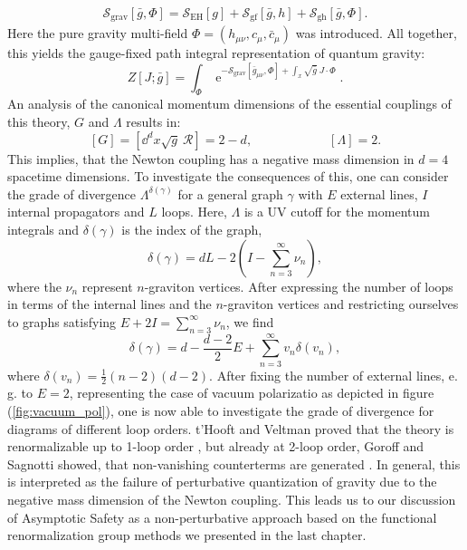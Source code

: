 \begin{align}
	\mathcal{S}_{\text{grav}}[\bar{g},\Phi] = \mathcal{S}_{\text{EH}}[g] + \mathcal{S}_{\text{gf}}[\bar{g}, h] + \mathcal{S}_{\text{gh}}[\bar{g},\Phi] .
\end{align}
 Here the pure gravity multi-field $\Phi=(h_{\mu\nu}, c_{\mu}, \bar{c}_{\mu})$ was introduced. All together, this yields the gauge-fixed path integral representation of quantum gravity:
 \begin{equation}
Z[J ; \bar{g}]=\int_{\Phi} \operatorname{e}^{-\mathcal{S}_{\text{grav}}\left[\bar{g}_{\mu\nu}, \Phi\right]+\int_x \sqrt{\bar{g}} \ J \cdot \Phi}.
\end{equation}
An analysis of the canonical momentum dimensions of the essential couplings of this theory, $G$ and $\Lambda$ results in:
\begin{equation}
\left[G\right] = \left[\dd^dx \sqrt{g}\ \mathcal{R}\right] = 2-d,  \qquad\qquad\qquad \left[\Lambda\right] = 2.
\end{equation}
This implies, that the Newton coupling has a negative mass dimension in $d=4$ spacetime dimensions. To investigate the consequences of this, one can consider the grade of divergence $\Lambda^{\delta(\gamma)}$ for a general graph $\gamma$ with $E$ external lines, $I$ internal propagators and $L$ loops. Here, $\Lambda$ is a UV cutoff for the momentum integrals and $\delta(\gamma)$ is the index of the graph,
\begin{equation}
	\delta(\gamma) = dL- 2\left(I-\sum_{n=3}^{\infty}\nu_n\right),
\end{equation}
where the $\nu_n$ represent $n$-graviton vertices. After expressing the number of loops in terms of the internal lines and the $n$-graviton vertices and restricting ourselves to graphs satisfying $E + 2I = \sum_{n=3}^{\infty}\nu_n$, we find
\begin{equation}
	\delta(\gamma)=d-\frac{d-2}{2} E+\sum\limits_{n=3}^{\infty} v_{n} \delta\left(v_{n}\right),
\end{equation}
where $\delta\left(v_{n}\right)=\frac{1}{2}(n-2)(d-2)$.
After fixing the number of external lines, e.\,g. to $E=2$, representing the case of vacuum polarizatio as depicted in figure (\ref{fig:vacuum_pol}), one is now able to investigate the grade of divergence for diagrams of different loop orders. t'Hooft and Veltman proved that the theory is renormalizable up to 1-loop order \cite{tHooftVeltmann1974}, but already at 2-loop order, Goroff and Sagnotti showed, that non-vanishing counterterms are generated \cite{GoroffSanotti1985}. In general, this is interpreted as the failure of perturbative quantization of gravity due to the negative mass dimension of the Newton coupling. This leads us to our discussion of Asymptotic Safety as a non-perturbative approach based on the functional renormalization group methods we presented in the last chapter.  

